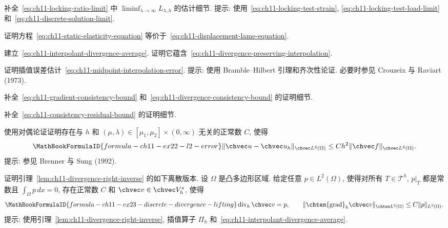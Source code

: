 \begin{MBExercise}
\label{exr:ch11-locking-limit-details}
补全~\eqref{eq:ch11-locking-ratio-limit} 中 $\liminf_{\lambda\to\infty}L_{\lambda,h}$ 的估计细节. 提示: 使用~\eqref{eq:ch11-locking-test-strain}, \eqref{eq:ch11-locking-test-load-limit} 和~\eqref{eq:ch11-discrete-solution-limit}.
\end{MBExercise}

\begin{MBExercise}
\label{exr:ch11-17}
证明方程~\eqref{eq:ch11-static-elasticity-equation} 等价于~\eqref{eq:ch11-displacement-lame-equation}.
\end{MBExercise}

\begin{MBExercise}
\label{exr:ch11-interpolant-divergence-average}
建立~\eqref{eq:ch11-interpolant-divergence-average}. 证明它蕴含~\eqref{eq:ch11-divergence-preserving-interpolation}.
\end{MBExercise}

\begin{MBExercise}
\label{exr:ch11-midpoint-interpolation-error}
证明插值误差估计~\eqref{eq:ch11-midpoint-interpolation-error}. 提示: 使用 Bramble--Hilbert 引理和齐次性论证. 必要时参见 Crouzeix 与 Raviart (1973).
\end{MBExercise}

\begin{MBExercise}
\label{exr:ch11-20}
补全~\eqref{eq:ch11-gradient-consistency-bound} 和~\eqref{eq:ch11-divergence-consistency-bound} 的证明细节.
\end{MBExercise}

\begin{MBExercise}
\label{exr:ch11-21}
补全~\eqref{eq:ch11-consistency-residual-bound} 的证明细节.
\end{MBExercise}

\begin{MBExercise}
\label{exr:ch11-22}
使用对偶论证证明存在与 $h$ 和 $(\mu,\lambda)\in[\mu_1,\mu_2]\times(0,\infty)$ 无关的正常数 $C$, 使得
\[
\MathBookFormulaID{formula-ch11-ex22-l2-error}
\|\chvec u-\chvec u_h\|_{\chvec L^2(\Omega)}
\leq Ch^2\|\chvec f\|_{\chvec L^2(\Omega)}.
\]
提示: 参见 Brenner 与 Sung (1992).
\end{MBExercise}

\begin{MBExercise}
\label{exr:ch11-23}
证明引理~\ref{lem:ch11-divergence-right-inverse} 的如下离散版本. 设 $\Omega$ 是凸多边形区域. 给定任意 $p\in L^2(\Omega)$, 使得对所有 $T\in\mathcal T^h$, $p|_T$ 都是常数且 $\int_\Omega p\,dx=0$, 存在正常数 $C$ 和 $\chvec v\in\chvec V_h^s$, 使得
\[
\MathBookFormulaID{formula-ch11-ex23-discrete-divergence-lifting}
\operatorname{div}_h\chvec v=p,
\qquad
\|\chten{\operatorname{grad}}_h\chvec v\|_{\chten L^2(\Omega)}
\leq C\|p\|_{L^2(\Omega)}.
\]
提示: 使用引理~\ref{lem:ch11-divergence-right-inverse}, 插值算子 $\Pi_h$ 和~\eqref{eq:ch11-interpolant-divergence-average}.
\end{MBExercise}

